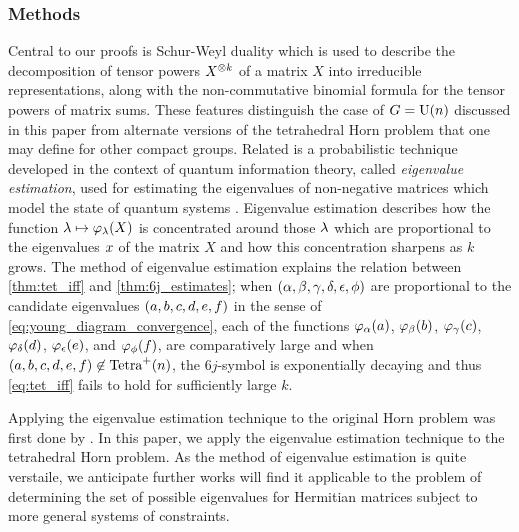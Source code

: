 \documentclass[notitlepage, 11pt, letterpaper]{amsart}
\begin{document}
\subsubsection*{Methods}
Central to our proofs is Schur-Weyl duality which is used to describe the decomposition of tensor powers $X^{\otimes k}$ of a matrix $X$ into irreducible representations, along with the non-commutative binomial formula for the tensor powers of matrix sums.
These features distinguish the case of $G=\operatorname{U}(n)$ discussed in this paper from alternate versions of the tetrahedral Horn problem that one may define for other compact groups.
Related is a probabilistic technique developed in the context of quantum information theory, called \textit{eigenvalue estimation}, used for estimating the eigenvalues of non-negative matrices which model the state of quantum systems \cite{keyl2001estimating,christandl2006spectra,odonnell2016efficient,hayashi2002quantum,childs2007weak,hayashi2017group}.
Eigenvalue estimation describes how the function $\lambda \mapsto \varphi_\lambda(X)$ is concentrated around those $\lambda$ which are proportional to the eigenvalues $x$ of the matrix $X$ and how this concentration sharpens as $k$ grows.
The method of eigenvalue estimation explains the relation between \cref{thm:tet_iff} and \cref{thm:6j_estimates};
when $(\alpha,\beta,\gamma,\delta,\epsilon,\phi)$ are proportional to the candidate eigenvalues $(a,b,c,d,e,f)$ in the sense of \cref{eq:young_diagram_convergence}, each of the functions $\varphi_\alpha(a)$, $\varphi_\beta(b)$, $\varphi_\gamma(c)$,  $\varphi_\delta(d)$, $\varphi_\epsilon(e)$, and $\varphi_\phi(f)$, are comparatively large and when $(a,b,c,d,e,f) \not \in \operatorname{Tetra}^{+}(n)$, the $6j$-symbol is exponentially decaying and thus \cref{eq:tet_iff} fails to hold for sufficiently large $k$.

Applying the eigenvalue estimation technique to the original Horn problem was first done by \citeauthor{christandl2008quantum} \cite{christandl2008quantum}.
In this paper, we apply the eigenvalue estimation technique to the tetrahedral Horn problem.
As the method of eigenvalue estimation is quite verstaile, we anticipate further works will find it applicable to the problem of determining the set of possible eigenvalues for Hermitian matrices subject to more general systems of constraints.

\end{document}
